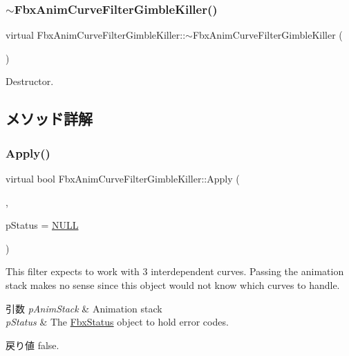 \subsubsection{\texorpdfstring{$\sim$\+Fbx\+Anim\+Curve\+Filter\+Gimble\+Killer()}{~FbxAnimCurveFilterGimbleKiller()}}
{\footnotesize\ttfamily virtual Fbx\+Anim\+Curve\+Filter\+Gimble\+Killer\+::$\sim$\+Fbx\+Anim\+Curve\+Filter\+Gimble\+Killer (\begin{DoxyParamCaption}{ }\end{DoxyParamCaption})\hspace{0.3cm}{\ttfamily [virtual]}}



Destructor. 



\subsection{メソッド詳解}
\mbox{\label{class_fbx_anim_curve_filter_gimble_killer_acee7b2b1c995cc079152b5ff8c96bfff}} 
\subsubsection{\texorpdfstring{Apply()}{Apply()}\hspace{0.1cm}{\footnotesize\ttfamily [1/5]}}
{\footnotesize\ttfamily virtual bool Fbx\+Anim\+Curve\+Filter\+Gimble\+Killer\+::\+Apply (\begin{DoxyParamCaption}\item[{\hyperlink{class_fbx_anim_stack}{Fbx\+Anim\+Stack} $\ast$}]{,  }\item[{\hyperlink{class_fbx_status}{Fbx\+Status} $\ast$}]{p\+Status = {\ttfamily \hyperlink{fbxarch_8h_a070d2ce7b6bb7e5c05602aa8c308d0c4}{N\+U\+LL}} }\end{DoxyParamCaption})\hspace{0.3cm}{\ttfamily [virtual]}}

This filter expects to work with 3 interdependent curves. Passing the animation stack makes no sense since this object would not know which curves to handle. 
\begin{DoxyParams}{引数}
{\em p\+Anim\+Stack} & Animation stack \\
\hline
{\em p\+Status} & The \hyperlink{class_fbx_status}{Fbx\+Status} object to hold error codes. \\
\hline
\end{DoxyParams}
\begin{DoxyReturn}{戻り値}
{\ttfamily false}. 
\end{DoxyReturn}



